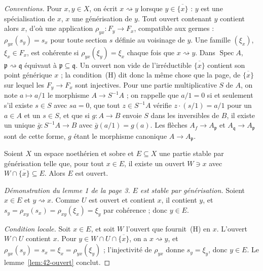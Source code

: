 \noindent\emph{Conventions.} Pour $x, y \in X$, on écrit $x \rightsquigarrow y$ lorsque $y \in \overline{\{x\}}$ : $y$ est une spécialisation de $x$, $x$ une générisation de $y$. Tout ouvert contenant $y$ contient alors $x$, d'où une application $\rho_{yx} : F_y \to F_x$, compatible aux germes : $\rho_{yx}(s_y) = s_x$ pour toute section $s$ définie au voisinage de $y$. Une famille $(\xi_x)$, $\xi_x \in F_x$, est cohérente si $\rho_{yx}(\xi_y) = \xi_x$ chaque fois que $x \rightsquigarrow y$. Dans $\operatorname{Spec} A$, $\mathfrak p \rightsquigarrow \mathfrak q$ équivaut à $\mathfrak p \subseteq \mathfrak q$. Un ouvert non vide de l'irréductible $\overline{\{x\}}$ contient son point générique $x$ ; la condition~(H) dit donc la même chose que la page,  de $\overline{\{x\}}$ sur lequel les $F_y \to F_x$ sont injectives. Pour une partie multiplicative $S$ de $A$, on note $a \mapsto a/1$ le morphisme $A \to S^{-1}A$ ; on rappelle que $a/1 = 0$ si et seulement s'il existe $s \in S$ avec $sa = 0$, que tout $z \in S^{-1}A$ vérifie $z \cdot (s/1) = a/1$ pour un $a \in A$ et un $s \in S$, et que si $g : A \to B$ envoie $S$ dans les inversibles de $B$, il existe un unique $\bar g : S^{-1}A \to B$ avec $\bar g(a/1) = g(a)$. Les flèches $A_f \to A_{\mathfrak p}$ et $A_{\mathfrak q} \to A_{\mathfrak p}$ sont de cette forme, $g$ étant le morphisme canonique $A \to A_{\mathfrak p}$.

\begin{lemme}\label{lem:42-ouvert}
Soient $X$ un espace noethérien et sobre et $E \subseteq X$ une partie stable par générisation telle que, pour tout $x \in E$, il existe un ouvert $W \ni x$ avec $W \cap \overline{\{x\}} \subseteq E$. Alors $E$ est ouvert.
\end{lemme}


\begin{proof}[Démonstration du lemme 1 de la page 3]
\emph{$E$ est stable par générisation.} Soient $x \in E$ et $y \rightsquigarrow x$. Comme $U$ est ouvert et contient $x$, il contient $y$, et $s_y = \rho_{xy}(s_x) = \rho_{xy}(\xi_x) = \xi_y$ par cohérence ; donc $y \in E$.

\emph{Condition locale.} Soit $x \in E$, et soit $W$ l'ouvert que fournit~(H) en $x$. L'ouvert $W \cap U$ contient $x$. Pour $y \in W \cap U \cap \overline{\{x\}}$, on a $x \rightsquigarrow y$, et $\rho_{yx}(s_y) = s_x = \xi_x = \rho_{yx}(\xi_y)$ ; l'injectivité de $\rho_{yx}$ donne $s_y = \xi_y$, donc $y \in E$. Le lemme~\ref{lem:42-ouvert} conclut.
\end{proof}

